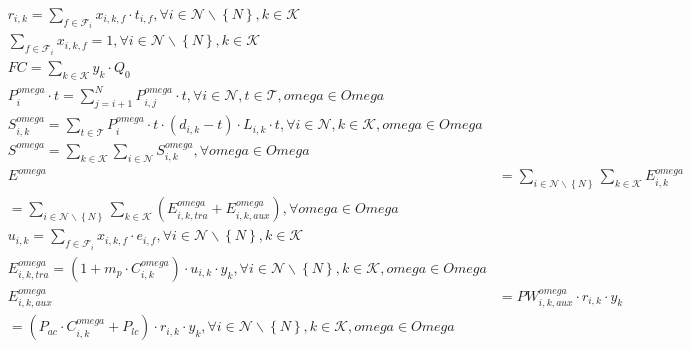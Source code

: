 \begin{align}
  & r_{i , k} = \underset{f \in \mathbf{\mathcal{F}}_{i}}{\sum} x_{i , k , f} \cdot t_{i , f} , \forall i \in \mathbf{\mathcal{N}} \backslash \left\{N\right\} , k \in \mathbf{\mathcal{K}} \tag{eq\_0017} \\
  & \underset{f \in \mathbf{\mathcal{F}}_{i}}{\sum} x_{i , k , f} = 1 , \forall i \in \mathbf{\mathcal{N}} \backslash \left\{N\right\} , k \in \mathbf{\mathcal{K}} \tag{eq\_0018} \\
  & \mathit{FC} = \underset{k \in \mathbf{\mathcal{K}}}{\sum} y_{k} \cdot Q_{0} \tag{eq\_0019} \\
  & P_{i}^{\mathit{omega}} \cdot t = \sum_{j = i + 1}^{N} P_{i , j}^{\mathit{omega}} \cdot t , \forall i \in \mathbf{\mathcal{N}} , t \in \mathbf{\mathcal{T}} , \mathit{omega} \in \mathit{Omega} \tag{eq\_0020} \\
  & S_{i , k}^{\mathit{omega}} = \underset{t \in \mathbf{\mathcal{T}}}{\sum} P_{i}^{\mathit{omega}} \cdot t \cdot \left(d_{i , k} - t\right) \cdot L_{i , k} \cdot t , \forall i \in \mathbf{\mathcal{N}} , k \in \mathbf{\mathcal{K}} , \mathit{omega} \in \mathit{Omega} \tag{eq\_0021} \\
  & S^{\mathit{omega}} = \underset{k \in \mathbf{\mathcal{K}}}{\sum} \underset{i \in \mathbf{\mathcal{N}}}{\sum} S_{i , k}^{\mathit{omega}} , \forall \mathit{omega} \in \mathit{Omega} \tag{eq\_0022} \\
  &  E^{\mathit{omega}} & = \underset{i \in \mathbf{\mathcal{N}} \backslash \left\{N\right\}}{\sum} \underset{k \in \mathbf{\mathcal{K}}}{\sum} E_{i , k}^{\mathit{omega}} \\ & = \underset{i \in \mathbf{\mathcal{N}} \backslash \left\{N\right\}}{\sum} \underset{k \in \mathbf{\mathcal{K}}}{\sum} \left(E_{i , k , \mathit{tra}}^{\mathit{omega}} + E_{i , k , \mathit{aux}}^{\mathit{omega}}\right) , \forall \mathit{omega} \in \mathit{Omega}  \tag{eq\_0023} \\
  & u_{i , k} = \underset{f \in \mathbf{\mathcal{F}}_{i}}{\sum} x_{i , k , f} \cdot e_{i , f} , \forall i \in \mathbf{\mathcal{N}} \backslash \left\{N\right\} , k \in \mathbf{\mathcal{K}} \tag{eq\_0025} \\
  & E_{i , k , \mathit{tra}}^{\mathit{omega}} = \left(1 + m_{p} \cdot C_{i , k}^{\mathit{omega}}\right) \cdot u_{i , k} \cdot y_{k} , \forall i \in \mathbf{\mathcal{N}} \backslash \left\{N\right\} , k \in \mathbf{\mathcal{K}} , \mathit{omega} \in \mathit{Omega} \tag{eq\_0026} \\
  &  E_{i , k , \mathit{aux}}^{\mathit{omega}} & = \mathit{PW}_{i , k , \mathit{aux}}^{\mathit{omega}} \cdot r_{i , k} \cdot y_{k} \\ & = \left(P_{\mathit{ac}} \cdot C_{i , k}^{\mathit{omega}} + P_{\mathit{lc}}\right) \cdot r_{i , k} \cdot y_{k} , \forall i \in \mathbf{\mathcal{N}} \backslash \left\{N\right\} , k \in \mathbf{\mathcal{K}} , \mathit{omega} \in \mathit{Omega}  \tag{eq\_0027} \\

\end{align}
